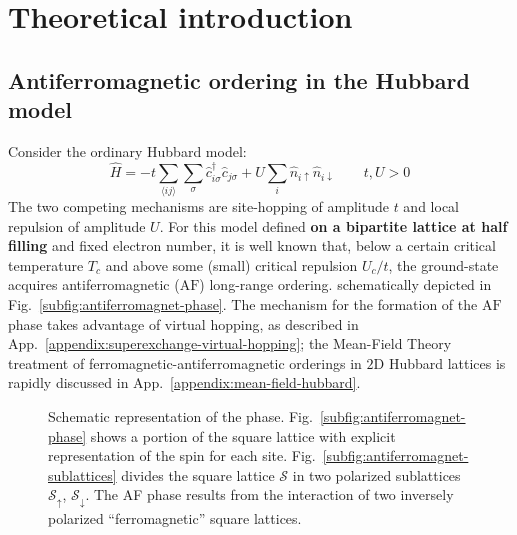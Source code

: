 \chapter{Theoretical introduction}\label{chapter:theoretical-introduction}

\todo

\section{Antiferromagnetic ordering in the Hubbard model}

Consider the ordinary Hubbard model:
\begin{equation}\label{eq:hubbard-model}
	\hat H = 
	-t \sum_{\langle ij \rangle} \sum_\sigma \hat c_{i\sigma}^\dagger \hat c_{j\sigma}
	+ U \sum_i \hat n_{i\uparrow} \hat n_{i\downarrow}
	\qquad
	t, U  > 0
\end{equation}
The two competing mechanisms are site-hopping of amplitude $t$ and local repulsion of amplitude $U$. For this model defined \textbf{on a bipartite lattice at half filling} and fixed electron number, it is well known \cite{hirsch1985hubbard} that, below a certain critical temperature $T_c$ and above some (small) critical repulsion $U_c/t$, the ground-state acquires antiferromagnetic ($\mathrm{AF}$) long-range ordering. schematically depicted in Fig.~\ref{subfig:antiferromagnet-phase}. The mechanism for the formation of the $\mathrm{AF}$ phase takes advantage of virtual hopping, as described in App.~\ref{appendix:superexchange-virtual-hopping}; the Mean-Field Theory treatment of ferromagnetic-antiferromagnetic orderings in $2\mathrm{D}$ Hubbard lattices is rapidly discussed in  App.~\ref{appendix:mean-field-hubbard}.

\begin{figure}
	\centering
	\hfil
	\caption{Schematic representation of the \AF phase. Fig.~\ref{subfig:antiferromagnet-phase} shows a portion of the square lattice with explicit representation of the spin for each site. Fig.~\ref{subfig:antiferromagnet-sublattices} divides the square lattice $\mathcal{S}$ in two polarized sublattices $\mathcal{S}_\uparrow$, $\mathcal{S}_\downarrow$. The AF phase results from the interaction of two inversely polarized ``ferromagnetic'' square lattices.}
	\label{fig:antiferromagnet-schemes}
\end{figure}

